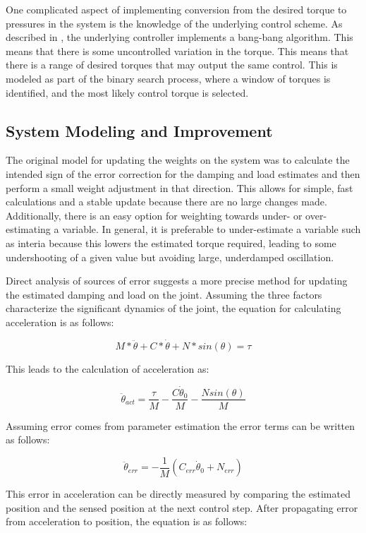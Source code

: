 \documentclass[letterpaper, 10 pt, conference]{IEEEconf} %
\newcommand{\bbss}[1]{\subsection{#1}}
\begin{document}
One complicated aspect of implementing conversion from the desired torque to 
pressures in the system is the
knowledge of the underlying control scheme. As described in \cite{HuntPMuscles},
the underlying controller implements a bang-bang algorithm. This means that 
there is some uncontrolled variation in the torque. This means that there is a
range of desired torques that may output the same control. This is modeled as
part of the binary search process, where a window of torques is identified, and
the most likely control torque is selected.

\bbss{System Modeling and Improvement}
\label{sec:systemImprovement}

The original model for updating the weights on the system was to calculate the
intended sign of the error correction for the damping and load estimates and 
then perform a small weight adjustment in that direction. This allows for 
simple, fast calculations and a stable update because there are no large 
changes made. Additionally, there is an easy option for weighting towards 
under- or over-estimating a variable. In general, it is preferable to 
under-estimate a variable such as interia because this lowers the estimated 
torque required, leading to some undershooting of a given value but avoiding
large, underdamped oscillation.

Direct analysis of sources of error suggests a more precise method for updating
the estimated damping and load on the joint. Assuming the three factors characterize the significant dynamics of the joint, the equation for calculating acceleration is as follows:

\begin{equation}
M * \ddot{\theta} + C * \dot{\theta} + N * sin(\theta) = \tau
\end{equation}

This leads to the calculation of acceleration as:

\begin{equation}
\ddot{\theta}_{act} = \dfrac{\tau}{M} - \dfrac{C \dot{\theta}_{0}}{M} - \dfrac{N sin(\theta)}{M}
\end{equation}

Assuming error comes from parameter estimation the error terms can be written as
follows:

\begin{equation}
\ddot{\theta}_{err} = - \dfrac{1}{M}
(C_{err} \dot{\theta}_{0} + N_{err})
\end{equation}

This error in acceleration can be directly measured by comparing the estimated
position and the sensed position at the next control step. After propagating error from acceleration to position, the equation is as follows:
\end{document}
